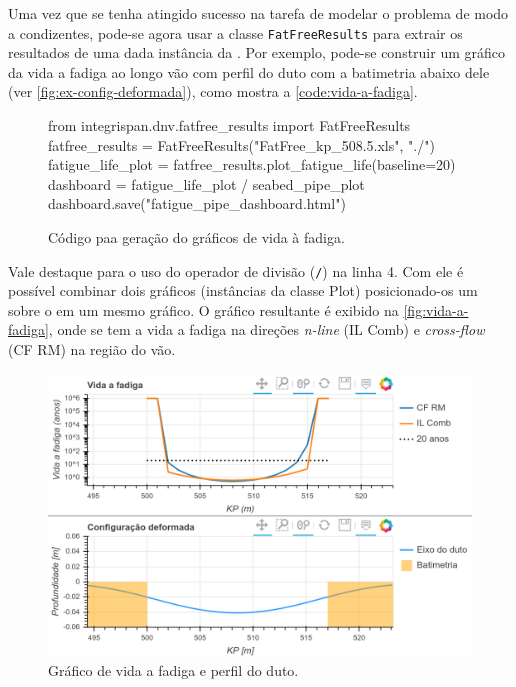 Uma vez que se tenha atingido sucesso na tarefa de modelar o problema de modo a condizentes, pode-se agora usar a classe \texttt{FatFreeResults} para extrair os resultados de uma dada instância da \fatfree. Por exemplo, pode-se construir um gráfico da vida a fadiga ao longo vão com perfil do duto com a batimetria abaixo dele (ver \autoref{fig:ex-config-deformada}), como mostra a \autoref{code:vida-a-fadiga}.

\begin{figure}[!ht]
	\caption{Código paa geração do gráficos de vida à fadiga.}\label{code:vida-a-fadiga}
	\begin{pythoncode}
from integrispan.dnv.fatfree_results import FatFreeResults
fatfree_results = FatFreeResults("FatFree_kp_508.5.xls", "./")
fatigue_life_plot = fatfree_results.plot_fatigue_life(baseline=20)
dashboard = fatigue_life_plot / seabed_pipe_plot
dashboard.save("fatigue_pipe_dashboard.html")
	\end{pythoncode}
\end{figure}

Vale destaque para o uso do operador de divisão (\texttt{/}) na linha 4. Com ele é possível combinar dois gráficos (instâncias da classe Plot) posicionado-os um sobre o em um mesmo gráfico. O gráfico resultante é exibido na \autoref{fig:vida-a-fadiga}, onde se tem a vida a fadiga na direções \textit{n-line} (IL Comb) e \textit{cross-flow} (CF RM) na região do vão.

\begin{figure}[!ht]
	\centering
	\caption{Gráfico de vida a fadiga e perfil do duto.}\label{fig:vida-a-fadiga}
	\includegraphics[width=\textwidth]{imagens/exemplo/vida-a-fadiga}
\end{figure}

